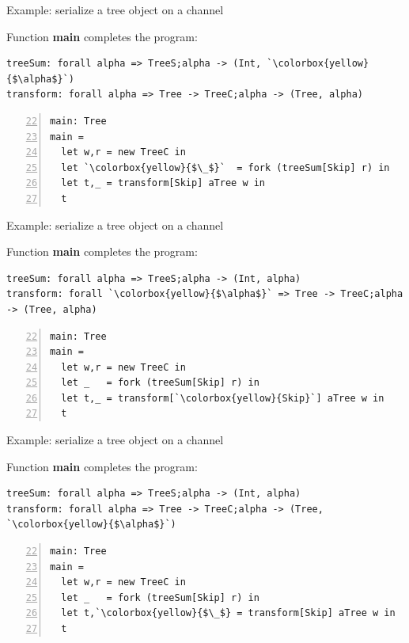 \documentclass[10pt]{beamer}
\begin{document}
\begin{frame}[fragile]{Example:  serialize a tree object on a channel}

Function \textbf{main} completes the program:

\begin{lstlisting}[escapeinside=\`\`]
treeSum: forall alpha => TreeS;alpha -> (Int, `\colorbox{yellow}{$\alpha$}`)
transform: forall alpha => Tree -> TreeC;alpha -> (Tree, alpha)
\end{lstlisting}
\begin{lstlisting}[numbers=left,firstnumber=22, xleftmargin=0.7cm, escapeinside=\`\`]
main: Tree
main =
  let w,r = new TreeC in
  let `\colorbox{yellow}{$\_$}`  = fork (treeSum[Skip] r) in
  let t,_ = transform[Skip] aTree w in
  t
\end{lstlisting}
\end{frame}

\begin{frame}[fragile]{Example:  serialize a tree object on a channel}

Function \textbf{main} completes the program:

\begin{lstlisting}[escapeinside=\`\`]
treeSum: forall alpha => TreeS;alpha -> (Int, alpha)
transform: forall `\colorbox{yellow}{$\alpha$}` => Tree -> TreeC;alpha -> (Tree, alpha)
\end{lstlisting}
\begin{lstlisting}[numbers=left,firstnumber=22, xleftmargin=0.7cm, escapeinside=\`\`]
main: Tree
main =
  let w,r = new TreeC in
  let _   = fork (treeSum[Skip] r) in
  let t,_ = transform[`\colorbox{yellow}{Skip}`] aTree w in
  t
\end{lstlisting}
\end{frame}

\begin{frame}[fragile]{Example:  serialize a tree object on a channel}

Function \textbf{main} completes the program:

\begin{lstlisting}[escapeinside=\`\`]
treeSum: forall alpha => TreeS;alpha -> (Int, alpha)
transform: forall alpha => Tree -> TreeC;alpha -> (Tree, `\colorbox{yellow}{$\alpha$}`)
\end{lstlisting}
\begin{lstlisting}[numbers=left,firstnumber=22, xleftmargin=0.7cm, escapeinside=\`\`]
main: Tree
main =
  let w,r = new TreeC in
  let _   = fork (treeSum[Skip] r) in
  let t,`\colorbox{yellow}{$\_$} = transform[Skip] aTree w in
  t
\end{lstlisting}
\end{frame}
\end{document}
